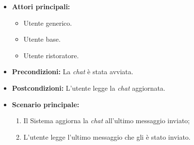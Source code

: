 \label{usecase:Lettura chat}
\begin{itemize}
	\item \textbf{Attori principali:} 
	\begin{itemize}
        \item Utente generico.
        \item Utente base.
        \item Utente ristoratore.
    \end{itemize}

	\item \textbf{Precondizioni:} La \textit{chat} è stata avviata.
	
	\item \textbf{Postcondizioni:} L'utente legge la \textit{chat} aggiornata.

	\item \textbf{Scenario principale:}
            \begin{enumerate}
                \item Il Sistema aggiorna la \textit{chat} all'ultimo messaggio inviato;
                \item L'utente legge l'ultimo messaggio che gli è stato inviato.
	      \end{enumerate}
\end{itemize}